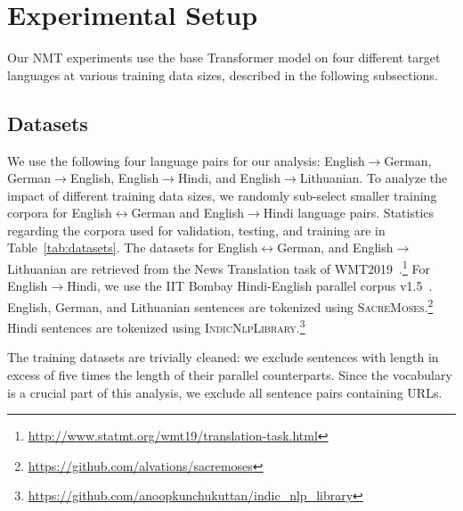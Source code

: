 \section{Experimental Setup}
\label{sec:exp-setup}

Our NMT experiments use the base Transformer model \cite{vaswani-2017-attention} on four different target languages at various training data sizes, described in the following subsections. 

\subsection{Datasets}
We use the following four language pairs for our analysis: English$\rightarrow$German, German$\rightarrow$English, English$\rightarrow$Hindi, and English$\rightarrow$Lithuanian. 
To analyze the impact of different training data sizes, we randomly sub-select smaller training corpora for English$\leftrightarrow$German and English$\rightarrow$Hindi language pairs. 
Statistics regarding the corpora used for validation, testing, and training are in Table~\ref{tab:datasets}.
The datasets for English$\leftrightarrow$German, and English$\rightarrow$Lithuanian are retrieved from the News Translation task of WMT2019~\cite{wmt19proceedings}.\footnote{\href{http://www.statmt.org/wmt19/translation-task.html}{http://www.statmt.org/wmt19/translation-task.html}}
For English$\rightarrow$Hindi, we use the IIT Bombay Hindi-English parallel corpus v1.5~\cite{kunchukuttan-etal-2018-iit}.
English, German, and Lithuanian sentences are tokenized using \textsc{SacreMoses}.\footnote{\href{https://github.com/alvations/sacremoses}{https://github.com/alvations/sacremoses}} 
Hindi sentences are tokenized using \textsc{IndicNlpLibrary}.\footnote{\href{https://github.com/anoopkunchukuttan/indic_nlp_library}{https://github.com/anoopkunchukuttan/indic\_nlp\_library}}

The training datasets are trivially cleaned: we exclude sentences with length in excess of five times the length of their parallel counterparts. 
Since the vocabulary is a crucial part of this analysis, we exclude all sentence pairs containing URLs. 

